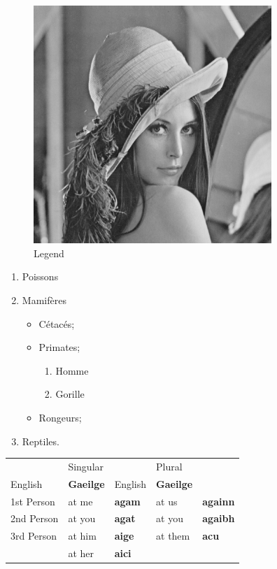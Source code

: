 \begin{figure}[h]
	\centering
	\includegraphics[width=90mm]{res/lena.png}
	\caption{Legend \label{while be in table of content}}
\end{figure}

\begin{enumerate}
    \item Poissons
    \item Mamifères
        \begin{itemize} %
            \item Cétacés;
            \item Primates;
            \begin{enumerate} %
                \item Homme
                \item Gorille
            \end{enumerate}
            \item Rongeurs;
        \end{itemize}
    \item Reptiles.
\end{enumerate}

\begin{tabular}{|l||l|l||l|l|}
    \hline&\multicolumn{2}{l|}{Singular}&\multicolumn{2}{l|}{Plural}\\
    \cline{2-5}English&\textbf{Gaeilge}&English&\textbf{Gaeilge}\\
    \hline\hline
        1st Person&at me&\textbf{agam}&at us&\textbf{againn}\\
        2nd Person&at you&\textbf{agat}&at you&\textbf{agaibh}\\
        3rd Person&at him&\textbf{aige}&at them&\textbf{acu}\\
        &at her&\textbf{aici}& & \\
    \hline
\end{tabular}


